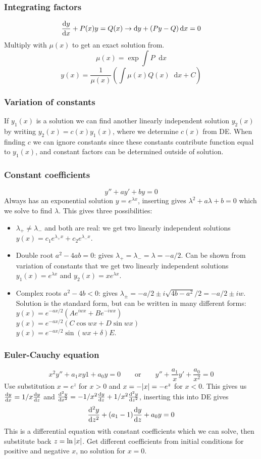 \documentclass[a4paper, 10pt]{article}
\newcommand*\diff{\mathop{}\!\mathrm{d}}
\begin{document}
\begin{multicols*}{3}
\subsubsection*{\small Integrating factors}
$$\dv{y}{x} + P(x)y = Q(x) \rightarrow \diff y + \left(Py-Q\right)\diff x = 0$$
Multiply with $\mu(x)$ to get an exact solution from.
$$ \mu(x) = \exp{\int P \diff x}$$
$$ y(x) = \frac{1}{\mu(x)}\left( \int \mu(x)Q(x)\diff x +C\right)$$
\subsubsection*{\small Variation of constants}
If $y_1(x)$ is a solution we can find another linearly independent solution $y_2(x)$ by writing $y_2(x) = c(x)y_1(x)$, where we determine $c(x)$ from DE. When finding $c$ we can ignore constants since these constants contribute function equal to $y_1(x)$, and constant factors can be determined outside of solution.
\subsubsection*{\small Constant coefficients}
$$ y'' + ay' + by = 0$$
Always has an exponential solution $y=e^{\lambda x}$, inserting gives $\lambda^2 + a\lambda + b = 0$ which we solve to find $\lambda$. This gives three possibilities:
\begin{itemize}
  \item $\lambda_+ \neq \lambda_-$ and both are real: we get two linearly independent solutions $y(x) = c_1e^{\lambda_+x} + c_2e^{\lambda_-x}$.
  \item Double root $a^2-4ab=0$: gives $\lambda_+ = \lambda_- = \lambda = -a/2$. Can be shown from variation of constants that we get two linearly independent solutions $y_1(x) = e^{\lambda x}$ and $y_2(x) = xe^{\lambda x}$.
  \item Complex roots $a^2-4b<0$: gives $\lambda_{\pm} = -a/2 \pm i\sqrt{4b-a^2}/2 = -a/2 \pm iw$. Solution is the standard form, but can be written in many different forms: $y(x) = e^{-ax/2}\left(Ae^{iwx} + Be^{-iwx}\right)$\\
  $y(x) = e^{-ax/2}\left( C\cos{wx} + D\sin{wx} \right)$\\
  $y(x) = e^{-ax/2}\sin{(wx+\delta)}E$.
\end{itemize}

\subsubsection*{\small Euler-Cauchy equation}
$$ x^2y'' + a_1xy1+a_0y = 0\qquad \text{or}\qquad y''+\frac{a_1}{x}y' + \frac{a_0}{x^2}=0$$
Use substitution $x=e^{z}$ for $x>0$ and $x=-\abs{x}=-e^{z}$ for $x<0$. This gives us $\dv{y}{x}=1/x\dv{y}{z}$ and $\dv[2]{y}{x} = -1/x^2 \dv{y}{z} + 1/x^2\dv[2]{y}{z}$, inserting this into DE gives
$$ \dv[2]{y}{z} + (a_1-1)\dv{y}{z} + a_0y = 0$$
This is a differential equation with constant coefficients which we can solve, then substitute back $z=\ln{\abs{x}}$. Get different coefficients from initial conditions for positive and negative $x$, no solution for $x=0$.


\end{multicols*}
\end{document}
